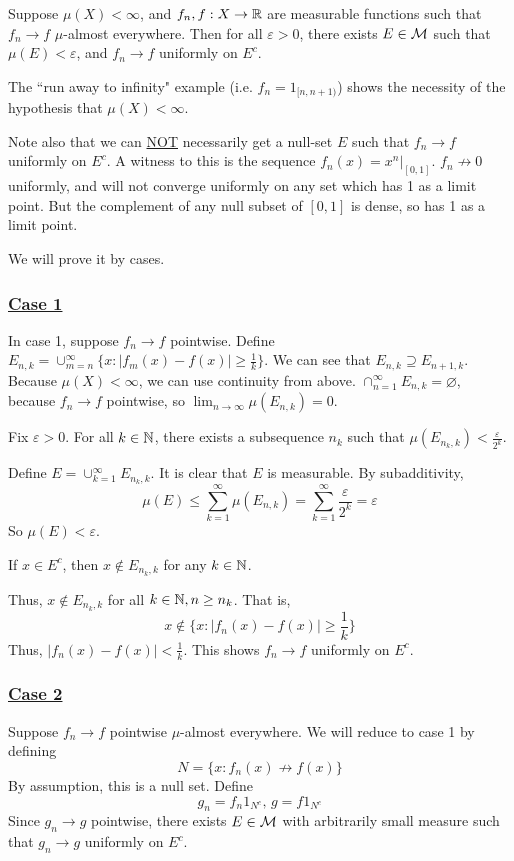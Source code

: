 \documentclass[x11names,reqno,14pt]{extarticle}
\newcommand*{\oo}{\infty}
\newcommand{\seq}[1]{_{#1 = 1}^\oo}
\begin{document}
Suppose $\mu(X)<\oo$, and $f_n, f:X\to\mathbb{R}$ are measurable functions such that $f_n\to f$ $\mu$-almost everywhere. Then for all $\varepsilon>0$, there exists $E \in \mathcal{M}$ such that $\mu(E)<\varepsilon$, and $f_n\to f$ uniformly on $E^c$.

\rem 

The ``run away to infinity" example (i.e. $f_n = 1_{[n, n + 1)}$) shows the necessity of the hypothesis that $\mu(X) < \oo$. 

Note also that we can \underline{NOT} necessarily get a null-set $E$ such that $f_n\to f$ uniformly on $E^c$. A witness to this is the sequence $f_n(x) = x^n|_{[0, 1]}$. $f_n\not\to0$ uniformly, and will not converge uniformly on any set which has 1 as a limit point. But the complement of any null subset of $[0, 1]$ is dense, so has 1 as a limit point. 

\proof

We will prove it by cases. 
\subsubsection*{\underline{Case 1}}

In case 1, suppose $f_n \to f$ pointwise. Define $E_{n, k} = \cup_{m=n}^\oo\{x: |f_m(x) - f(x)| \geq \frac{1}{k}\}$. We can see that $E_{n, k} \supseteq E_{n + 1, k}$. Because $\mu(X) < \oo$, we can use continuity from above. $\cap\seq{n}E_{n, k} = \varnothing$, because $f_n \to f$ pointwise, so $\lim_{n\to\oo}\mu(E_{n, k}) = 0$. 

Fix $\varepsilon>0$. For all $k \in \mathbb{N}$, there exists a subsequence $n_k$ such that $\mu(E_{n_k, k}) < \frac{\varepsilon}{2^k}$. 

Define $E = \cup\seq{k}E_{n_k, k}$. It is clear that $E$ is measurable. By subadditivity, 
\[
\mu(E) \leq \sum\seq{k}\mu(E_{n, k}) = \sum\seq{k}\frac{\varepsilon}{2^k} = \varepsilon
\]
So $\mu(E) < \varepsilon$. 

If $x \in E^c$, then $x\not\in E_{n_k, k}$ for any $k\in\mathbb{N}$. 

Thus, $x\not\in E_{n_k, k}$ for all $k \in \mathbb{N}, n \geq n_k$. That is, 
\[
x\not\in\{x: |f_n(x) - f(x) | \geq \frac{1}{k}\}
\]
Thus, $|f_n(x) - f(x)| < \frac{1}{k}$. This shows $f_n\to f$ uniformly on $E^c$. 

\subsubsection*{\underline{Case 2}}
Suppose $f_n\to f$ pointwise $\mu$-almost everywhere. We will reduce to case 1 by defining
\[
N = \{x: f_n(x)\not\to f(x)\}
\]
By assumption, this is a null set. Define
\[
g_n = f_n1_{N^c},\, g = f1_{N^c}
\]
Since $g_n \to g$ pointwise, there exists $E \in \mathcal{M}$ with arbitrarily small measure such that $g_n\to g$ uniformly on $E^c$. 
\end{document}
